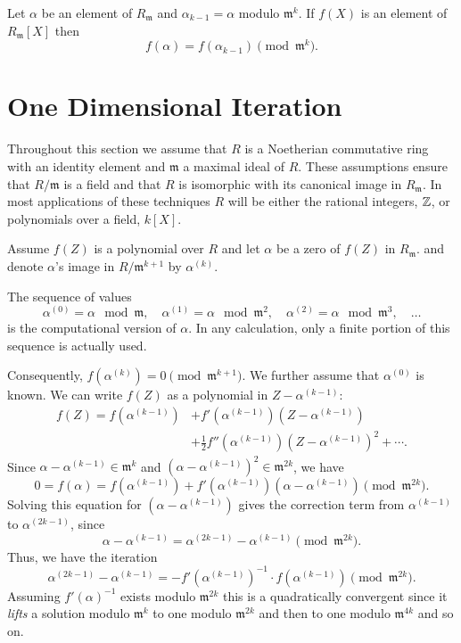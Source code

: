 {\begin{proposition}
Let $\alpha$ be an element of $R_\mathfrak{m}$ and $\alpha_{k-1} = \alpha$
modulo $\mathfrak{m}^k$.  If $f(X)$ is an element of $R_\mathfrak{m}[X]$ then
\[
f(\alpha) = f(\alpha_{k-1}) \pmod{\mathfrak{m}^k}.
\]
\end{proposition}

\section{One Dimensional Iteration}
\label{Univariate:Newton:Sec}

Throughout this section we assume that $R$ is a Noetherian commutative
ring with an identity element and $\mathfrak{m}$ a
maximal ideal of $R$.  These assumptions ensure that $R/\mathfrak{m}$ is
a field and that $R$ is isomorphic with its canonical image in
$R_\mathfrak{m}$.  In most applications of these techniques $R$ will be
either the rational integers, $\mathbb{Z}$, or polynomials over a field,
$k[X]$.

Assume $f(Z)$ is a polynomial over $R$ and let $\alpha$ be a zero of $f(Z)$
in $R_\mathfrak{m}$. and denote $\alpha$'s image in $R/\mathfrak{m}^{k+1}$ by
$\alpha^{(k)}$.  

The sequence of values
\[
\alpha^{(0)} = \alpha \mod{\mathfrak{m}},\quad 
\alpha^{(1)} = \alpha \mod{\mathfrak{m}^2}, \quad
\alpha^{(2)} = \alpha \mod{\mathfrak{m}^3}, \quad \ldots
\]
is the computational version of $\alpha$. In any calculation, only a
finite portion of this sequence is actually used. 

Consequently, $f(\alpha^{(k)}) = 0 \pmod{\mathfrak{m}^{k+1}}$.  We
further assume that $\alpha^{(0)}$ is known.  We can write $f(Z)$ as a
polynomial in $Z - \alpha^{(k-1)}$:
\[
\begin{aligned}
f(Z) = f(\alpha^{(k-1)}) &+ f'(\alpha^{(k-1)}) (Z - \alpha^{(k-1)}) \\
 & + \frac{1}{2} f''(\alpha^{(k-1)}) (Z - \alpha^{(k-1)})^2 + \cdots.
\end{aligned}
\]
Since $\alpha-\alpha^{(k-1)} \in \mathfrak{m}^k$ and $(\alpha - \alpha^{(k-1)})^2
\in \mathfrak{m}^{2k}$, we have
\[
0 = f(\alpha) = f(\alpha^{(k-1)}) + f'(\alpha^{(k-1)}) (\alpha -
\alpha^{(k-1)}) \pmod{\mathfrak{m}^{2k}}.
\]
Solving this equation for $(\alpha - \alpha^{(k-1)})$ gives the correction
term from $\alpha^{(k-1)}$ to $\alpha^{(2k-1)}$, since
\[
\alpha - \alpha^{(k-1)} = \alpha^{(2k-1)} - \alpha^{(k-1)}
\pmod{\mathfrak{m}^{2k}}.
\]
Thus, we have the iteration
\begin{equation}\label{Basic:UNewton:Eq}
\alpha^{(2k-1)} - \alpha^{(k-1)} = - f'(\alpha^{(k-1)})^{-1} 
  \cdot f(\alpha^{(k-1)}) 
 \pmod{\mathfrak{m}^{2k}}.
\end{equation}
Assuming $f'(\alpha)^{-1}$ exists modulo $\mathfrak{m}^{2k}$ this is a
quadratically convergent
since it {\em lifts} a solution modulo $\mathfrak{m}^k$ to one modulo
$\mathfrak{m}^{2k}$ and then to one modulo $\mathfrak{m}^{4k}$ and so on.

}
